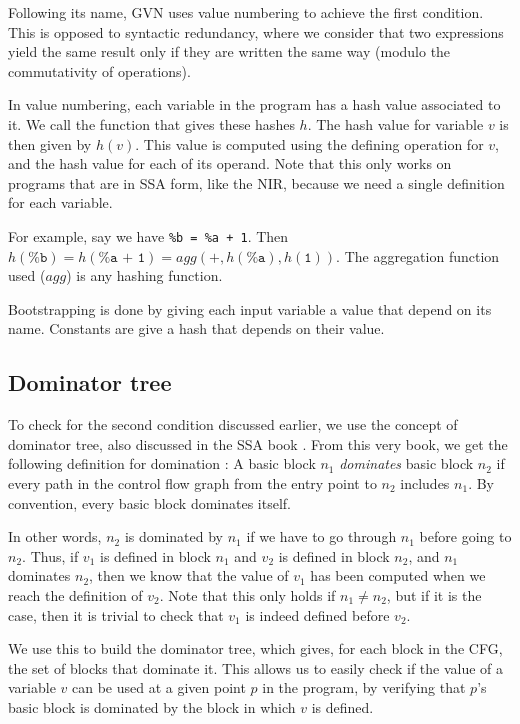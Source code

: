 \documentclass[11pt,a4paper]{article}
\newcommand{\nir}[1]{\texttt{#1}}
\begin{document}
Following its name, GVN uses value numbering to achieve the first condition. This is opposed to syntactic redundancy, where we consider that two expressions yield the same result only if they are written the same way (modulo the commutativity of operations).

In value numbering, each variable in the program has a hash value associated to it. We call the function that gives these hashes $h$. The hash value for variable $v$ is then given by $h(v)$. This value is computed using the defining operation for $v$, and the hash value for each of its operand. Note that this only works on programs that are in SSA form, like the NIR, because we need a single definition for each variable.

For example, say we have \nir{\%b = \%a + 1}. Then $h(\nir{\%b}) = h(\nir{\%a + 1}) = agg(\nir{+}, h(\nir{\%a}), h(\nir{1}))$. The aggregation function used ($agg$) is any hashing function.

Bootstrapping is done by giving each input variable a value that depend on its name. Constants are give a hash that depends on their value.

\subsection{Dominator tree}

To check for the second condition discussed earlier, we use the concept of dominator tree, also discussed in the SSA book \cite{ssabook}. From this very book, we get the following definition for domination :
\newline
A basic block $n_1$ \textit{dominates} basic block $n_2$ if every path in the control flow graph from the entry point to $n_2$ includes $n_1$. By convention, every basic block dominates itself.

In other words, $n_2$ is dominated by $n_1$ if we have to go through $n_1$ before going to $n_2$. Thus, if $v_1$ is defined in block $n_1$ and $v_2$ is defined in block $n_2$, and $n_1$ dominates $n_2$, then we know that the value of $v_1$ has been computed when we reach the definition of $v_2$. Note that this only holds if $n_1 \neq n_2$, but if it is the case, then it is trivial to check that $v_1$ is indeed defined before $v_2$.

We use this to build the dominator tree, which gives, for each block in the CFG, the set of blocks that dominate it. This allows us to easily check if the value of a variable $v$ can be used at a given point $p$ in the program, by verifying that $p$'s basic block is dominated by the block in which $v$ is defined.
\end{document}
